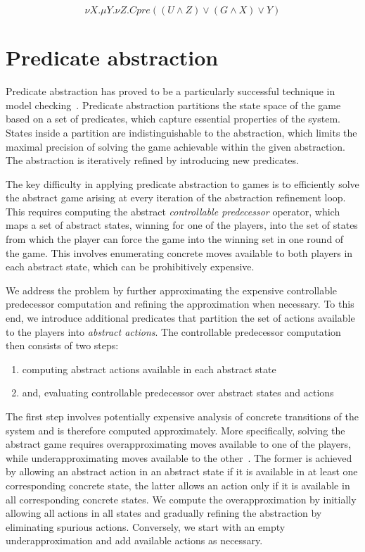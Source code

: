 \documentclass[a4paper,twoside,openright,11pt]{book}
\theoremstyle{definition}
\begin{document}
\begin{equation}
    \nu X. \mu Y. \nu Z. Cpre((U \wedge Z) \vee (G \wedge X) \vee Y)
\end{equation}

\section{Predicate abstraction}

Predicate abstraction has proved to be a particularly successful technique in model checking~\cite{Graf_Saidi_97}. Predicate abstraction partitions the state space of the game based on a set of predicates, which capture essential properties of the system. States inside a partition are indistinguishable to the abstraction, which limits the maximal precision of solving the game achievable within the given abstraction. The abstraction is iteratively refined by introducing new predicates.

The key difficulty in applying predicate abstraction to games is to efficiently solve the abstract game arising at every iteration of the abstraction refinement loop. This requires computing the abstract \emph{controllable predecessor} operator, which maps a set of abstract states, winning for one of the players, into the set of states from which the player can force the game into the winning set in one round of the game. This involves enumerating concrete moves available to both players in each abstract state, which can be prohibitively expensive.  

We address the problem by further approximating the expensive controllable predecessor computation and refining the approximation when necessary. To this end, we introduce additional predicates that partition the set of actions available to the players into \emph{abstract actions}. The controllable predecessor computation then consists of two steps: 

\begin{enumerate}
    \item computing abstract actions available in each abstract state
    \item and, evaluating controllable predecessor over abstract states and actions
\end{enumerate}

The first step involves potentially expensive analysis of concrete transitions of the system and is therefore computed approximately. More specifically, solving the abstract game requires overapproximating moves available to one of the players, while underapproximating moves available to the other~\cite{Henzinger_JM_03}.  The former is achieved by allowing an abstract action in an abstract state if it is available in at least one corresponding concrete state, the latter allows an action only if it is available in all corresponding concrete states. We compute the overapproximation by initially allowing all actions in all states and gradually refining the abstraction by eliminating spurious actions.  Conversely, we start with an empty underapproximation and add available actions as necessary.
\end{document}
